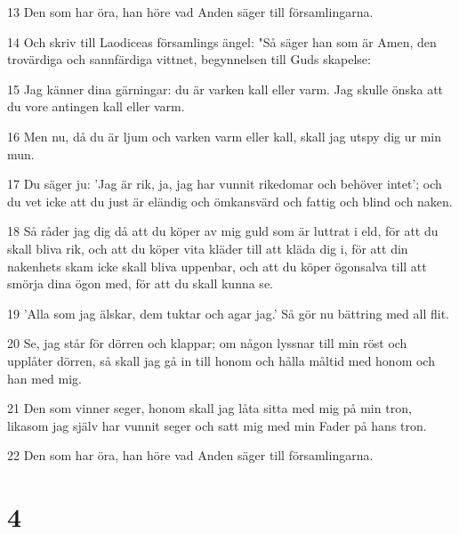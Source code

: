 \par 13 Den som har öra, han höre vad Anden säger till församlingarna.
\par 14 Och skriv till Laodiceas församlings ängel: "Så säger han som är Amen, den trovärdiga och sannfärdiga vittnet, begynnelsen till Guds skapelse:
\par 15 Jag känner dina gärningar: du är varken kall eller varm. Jag skulle önska att du vore antingen kall eller varm.
\par 16 Men nu, då du är ljum och varken varm eller kall, skall jag utspy dig ur min mun.
\par 17 Du säger ju: 'Jag är rik, ja, jag har vunnit rikedomar och behöver intet'; och du vet icke att du just är eländig och ömkansvärd och fattig och blind och naken.
\par 18 Så råder jag dig då att du köper av mig guld som är luttrat i eld, för att du skall bliva rik, och att du köper vita kläder till att kläda dig i, för att din nakenhets skam icke skall bliva uppenbar, och att du köper ögonsalva till att smörja dina ögon med, för att du skall kunna se.
\par 19 'Alla som jag älskar, dem tuktar och agar jag.' Så gör nu bättring med all flit.
\par 20 Se, jag står för dörren och klappar; om någon lyssnar till min röst och upplåter dörren, så skall jag gå in till honom och hålla måltid med honom och han med mig.
\par 21 Den som vinner seger, honom skall jag låta sitta med mig på min tron, likasom jag själv har vunnit seger och satt mig med min Fader på hans tron.
\par 22 Den som har öra, han höre vad Anden säger till församlingarna.

\chapter{4}

